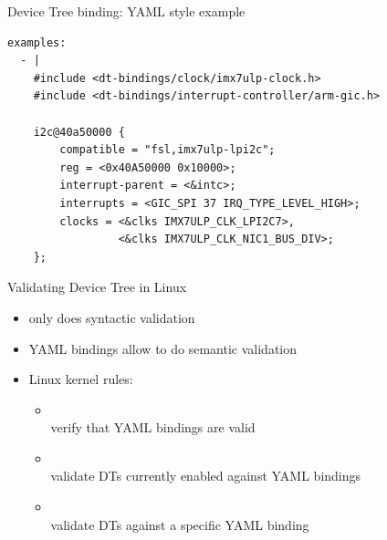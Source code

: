 \begin{frame}[fragile]{Device Tree binding: YAML style example}
    \begin{block}{}
      {\fontsize{5}{7}\selectfont
\begin{verbatim}
examples:
  - |
    #include <dt-bindings/clock/imx7ulp-clock.h>
    #include <dt-bindings/interrupt-controller/arm-gic.h>

    i2c@40a50000 {
        compatible = "fsl,imx7ulp-lpi2c";
        reg = <0x40A50000 0x10000>;
        interrupt-parent = <&intc>;
        interrupts = <GIC_SPI 37 IRQ_TYPE_LEVEL_HIGH>;
        clocks = <&clks IMX7ULP_CLK_LPI2C7>,
                 <&clks IMX7ULP_CLK_NIC1_BUS_DIV>;
    };

\end{verbatim}
      }
    \end{block}
\end{frame}

\begin{frame}{Validating Device Tree in Linux}
  \begin{itemize}
  \item {} only does syntactic validation
  \item YAML bindings allow to do semantic validation
  \item Linux kernel  rules:
    \begin{itemize}
    \item {}\\
      verify that YAML bindings are valid
    \item {}\\
      validate DTs currently enabled against YAML bindings
    \item {}\\
      validate DTs against a specific YAML binding
    \end{itemize}
  \end{itemize}
\end{frame}

